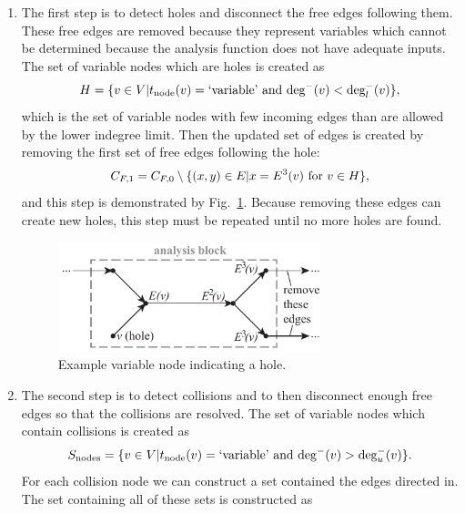 \begin{enumerate}
\item The first step is to detect holes and disconnect the free edges following them. These free edges are removed because they represent variables which cannot be determined because the analysis function does not have adequate inputs. The set of variable nodes which are holes is created as
\begin{equation}
H = \{v \in V | t_\textrm{node}(v) = \textrm{`variable'} \textrm{ and } \textrm{deg}^-(v) < \textrm{deg}_l^-(v) \},
\end{equation}
which is the set of variable nodes with few incoming edges than are allowed by the lower indegree limit.
Then the updated set of edges is created by removing the first set of free edges following the hole:
\begin{equation}
C_{F,1} = C_{F,0} \setminus \{(x,y) \in E | x=E^3(v) \textrm{ for } v \in H\},
\end{equation}
and this step is demonstrated by Fig.~\ref{f:holes}. Because removing these edges can create new holes, this step must be repeated until no more holes are found.
\begin{figure}[htb!]
	\begin{center}
	\includegraphics[width=3in]{images/analysis_block_hole}
	\end{center}
	\vspace{-20pt}
\caption{Example variable node indicating a hole.}
\label{f:holes}
\end{figure}
\item The second step is to detect collisions and to then disconnect enough free edges so that the collisions are resolved. The set of variable nodes which contain collisions is created as
\begin{equation}
S_\textrm{nodes} = \{v \in V | t_\textrm{node}(v) = \textrm{`variable'} \textrm{ and } \textrm{deg}^-(v) > \textrm{deg}_u^-(v) \}.
\end{equation}
For each collision node we can construct a set contained the edges directed in. The set containing all of these sets is constructed as
\begin{equation}

\end{equation}
\end{enumerate}
